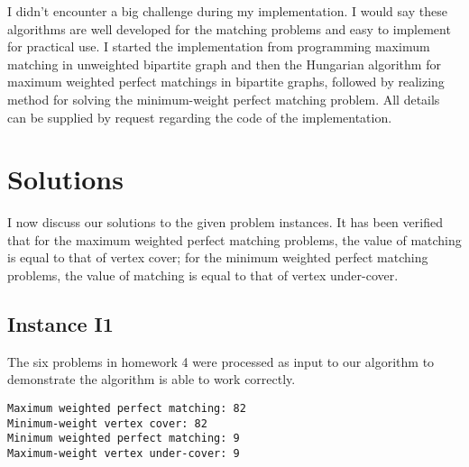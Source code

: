 \documentclass[11pt]{article}
\begin{document}
I didn't encounter a big challenge during my implementation. I would say these algorithms are well developed for the matching problems and easy to implement for practical use. I started the implementation from programming maximum matching in unweighted bipartite graph and then the Hungarian algorithm for maximum weighted perfect matchings in bipartite graphs, followed by realizing method for solving the minimum-weight perfect matching problem. All details can be supplied by request regarding the code of the implementation.
\section{Solutions}

I now discuss our solutions to the given problem instances. It has been verified that for the maximum weighted perfect matching problems, the value of matching is equal to that of vertex cover; for the minimum weighted perfect matching problems, the value of matching is equal to that of vertex under-cover.

\subsection{Instance I1}
The six problems in homework 4 were processed as input to our algorithm to demonstrate the algorithm is able to work correctly.%

\begin{verbatim}
Maximum weighted perfect matching: 82
Minimum-weight vertex cover: 82
Minimum weighted perfect matching: 9
Maximum-weight vertex under-cover: 9
\end{verbatim}
\end{document}
